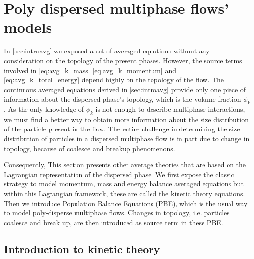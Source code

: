 \section{Poly dispersed multiphase flows' models}
\label{sec:PBE}

In \ref{sec:introavg} we exposed a set of averaged equations without any consideration on the topology of the present phases. 
However, the source terms involved in \ref{eq:avg_k_mass} \ref{eq:avg_k_momentum} and \ref{eq:avg_k_total_energy} depend highly on the topology of the flow. 
The continuous averaged equations derived in \ref{sec:introavg} provide only one piece of information about the dispersed phase's topology, which is the volume fraction $\phi_k$.
As the only knowledge of $\phi_k$ is not enough to describe multiphase interactions, we must find a better way to obtain more information about the size distribution of the particle present in the flow.
The entire challenge in determining the size distribution of particles in a dispersed multiphase flow is in part due to change in topology, because of coalesce and breakup phenomenons. 

Consequently, This section presents other average theories that are based on the Lagrangian representation of the dispersed phase. 
We first expose the classic strategy to model momentum, mass and energy balance averaged equations but within this Lagrangian framework, these are called the kinetic theory equations. 
Then we introduce Population Balance Equations (PBE), which is the usual way to model poly-disperse multiphase flows. 
Changes in topology, i.e. particles coalesce and break up, are then introduced as source term in these PBE. 


\subsection{Introduction to kinetic theory}

